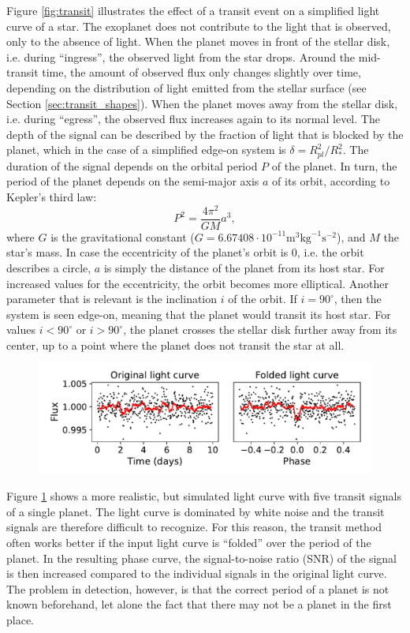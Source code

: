 Figure \ref{fig:transit} illustrates the effect of a transit event on a simplified light curve of a star. The exoplanet does not contribute to the light that is observed, only to the absence of light. When the planet moves in front of the stellar disk, i.e. during ``ingress'', the observed light from the star drops. Around the mid-transit time, the amount of observed flux only changes slightly over time, depending on the distribution of light emitted from the stellar surface (see Section \ref{sec:transit_shapes}). When the planet moves away from the stellar disk, i.e. during ``egress'', the observed flux increases again to its normal level. The depth of the signal can be described by the fraction of light that is blocked by the planet, which in the case of a simplified edge-on system is $\delta = R_{pl}^2 / R_*^2$. The duration of the signal depends on the orbital period $P$ of the planet. In turn, the period of the planet depends on the semi-major axis $a$ of its orbit, according to Kepler's third law:
\begin{equation}
    \label{eq:kepler}
    P^2 = \frac{4 \pi^2}{GM}  a^3,
\end{equation}
where $G$ is the gravitational constant ($G=6.67408 \cdot 10^{-11} \text{m}^3 \text{kg}^{-1} \text{s}^{-2}$), and $M$ the star’s mass.
In case the eccentricity of the planet's orbit is 0, i.e. the orbit describes a circle, $a$ is simply the distance of the planet from its host star. For increased values for the eccentricity, the orbit becomes more elliptical. Another parameter that is relevant is the inclination $i$ of the orbit. If $i=90^\circ$, then the system is seen edge-on, meaning that the planet would transit its host star. For values $i < 90^\circ$ or $i > 90^\circ$, the planet crosses the stellar disk further away from its center, up to a point where the planet does not transit the star at all.

\begin{figure}
    \centering
    \includegraphics[width=0.6\linewidth]{Background/Figures/folding.pdf}
    \caption{}
    \label{fig:folding}
\end{figure}


Figure \ref{fig:folding} shows a more realistic, but simulated light curve with five transit signals of a single planet. The light curve is dominated by white noise and the transit signals are therefore difficult to recognize. For this reason, the transit method often works better if the input light curve is ``folded'' over the period of the planet. In the resulting phase curve, the signal-to-noise ratio (SNR) of the signal is then increased compared to the individual signals in the original light curve. The problem in detection, however, is that the correct period of a planet is not known beforehand, let alone the fact that there may not be a planet in the first place.
